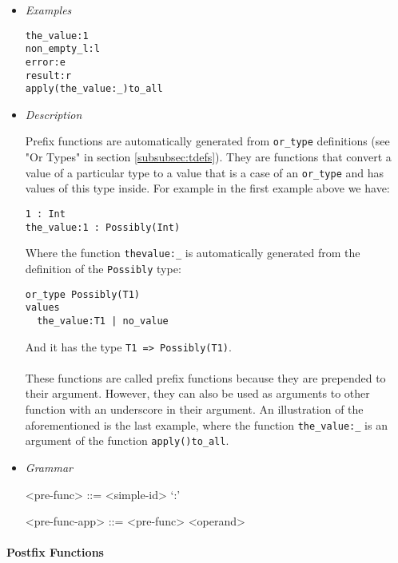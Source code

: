 \documentclass{article}
\begin{document}
\begin{itemize}

\item \textit{Examples}
\begin{verbatim}
the_value:1
non_empty_l:l
error:e
result:r
apply(the_value:_)to_all
\end{verbatim}

\item \textit{Description}

Prefix functions are automatically generated from \verb|or_type| definitions
(see "Or Types" in section \ref{subsubsec:tdefs}). They are functions that
convert a value of a particular type to a value that is a case of an
\verb|or_type| and has values of this type inside. For example in the
first example above we have:
\begin{verbatim}
1 : Int
the_value:1 : Possibly(Int)
\end{verbatim}
Where the function \verb|thevalue:_| is automatically generated from the
definition of the \verb|Possibly| type:
\begin{verbatim}
or_type Possibly(T1)
values
  the_value:T1 | no_value
\end{verbatim}
And it has the type \verb|T1 => Possibly(T1)|.
\\\\
These functions are called prefix functions because they are prepended to
their argument. However, they can also be used as arguments to other function
with an underscore in their argument.
An illustration of the aforementioned is the last example, where the function
\verb|the_value:_| is an argument of the function \verb|apply()to_all|.

\item \textit{Grammar}
\begin{grammar}
<pre-func> ::= <simple-id> `:'

<pre-func-app> ::= <pre-func> <operand>
\end{grammar}

\end{itemize}

\newpage
\paragraph{Postfix Functions}
\end{document}
